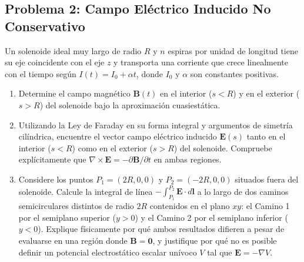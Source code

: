 \documentclass[11pt]{article}
\begin{document}
\subsection*{Problema 2: Campo Eléctrico Inducido No Conservativo}
Un solenoide ideal muy largo de radio $R$ y $n$ espiras por unidad de longitud tiene su eje coincidente con el eje $z$ y transporta una corriente que crece linealmente con el tiempo según $I(t) = I_0 + \alpha t$, donde $I_0$ y $\alpha$ son constantes positivas.
\begin{enumerate}
    \item[a)] Determine el campo magnético $\mathbf{B}(t)$ en el interior ($s < R$) y en el exterior ($s > R$) del solenoide bajo la aproximación cuasiestática.
    \item[b)] Utilizando la Ley de Faraday en su forma integral y argumentos de simetría cilíndrica, encuentre el vector campo eléctrico inducido $\mathbf{E}(s)$ tanto en el interior ($s < R$) como en el exterior ($s > R$) del solenoide. Compruebe explícitamente que $\nabla \times \mathbf{E} = -\partial \mathbf{B}/\partial t$ en ambas regiones.
    \item[c)] Considere los puntos $P_1 = (2R, 0, 0)$ y $P_2 = (-2R, 0, 0)$ situados fuera del solenoide. Calcule la integral de línea $-\int_{P_1}^{P_2} \mathbf{E} \cdot d\mathbf{l}$ a lo largo de dos caminos semicirculares distintos de radio $2R$ contenidos en el plano $xy$: el Camino 1 por el semiplano superior ($y > 0$) y el Camino 2 por el semiplano inferior ($y < 0$). Explique físicamente por qué ambos resultados difieren a pesar de evaluarse en una región donde $\mathbf{B} = \mathbf{0}$, y justifique por qué no es posible definir un potencial electrostático escalar unívoco $V$ tal que $\mathbf{E} = -\nabla V$.
\end{enumerate}
\newpage
\end{document}
